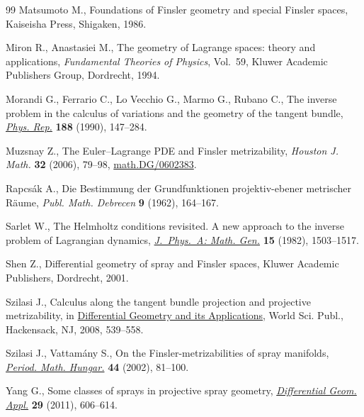 \documentclass[11pt]{article}
\numberwithin{equation}{section}
\begin{document}
\begin{thebibliography}{99}
Matsumoto M.,
Foundations of Finsler geometry and special Finsler spaces, Kaiseisha Press, Shigaken, 1986.

Miron R., Anastasiei M.,
The geometry of Lagrange spaces: theory and applications,
{\it Fundamental Theories of Physics}, Vol.~59, Kluwer Academic Publishers Group, Dordrecht, 1994.

Morandi G., Ferrario C., Lo Vecchio G., Marmo G., Rubano C.,
The inverse problem in the calculus of variations and the geometry of the tangent bundle,
\href{http://dx.doi.org/10.1016/0370-1573(90)90137-Q}{{\it Phys. Rep.}} {\bf 188} (1990), 147--284.

Muzsnay Z.,
The Euler--Lagrange PDE and Finsler metrizability,
{\it Houston J. Math.}  \textbf{32} (2006), 79--98,
\href{http://arxiv.org/abs/math.DG/0602383}{math.DG/0602383}.

Rapcs\'ak A.,
Die Bestimmung der Grundfunktionen projektiv-ebener metrischer R\"aume,
{\it Publ. Math. Debrecen} {\bf 9} (1962), 164--167.

Sarlet W.,
The Helmholtz conditions revisited. A new approach to the inverse problem of Lagrangian dynamics,
\href{http://dx.doi.org/10.1088/0305-4470/15/5/013}{{\it J.~Phys.~A: Math. Gen.}} \textbf{15} (1982), 1503--1517.

Shen Z.,
Dif\/ferential geometry of spray and Finsler spaces,
Kluwer Academic Publishers, Dordrecht, 2001.

Szilasi J.,
Calculus along the tangent bundle projection and projective metrizability,
in \href{http://dx.doi.org/10.1142/9789812790613_0045}{Dif\/ferential Geometry and its Applications},
 World Sci. Publ., Hackensack, NJ, 2008, 539--558.

Szilasi J., Vattam\'any S.,
On the Finsler-metrizabilities of spray manifolds,
\href{http://dx.doi.org/10.1023/A:1014928103275}{{\it Period. Math. Hungar.}} {\bf 44} (2002), 81--100.

Yang G.,
Some classes of sprays in projective spray geometry,
\href{http://dx.doi.org/10.1016/j.difgeo.2011.04.041}{{\it Differential Geom. Appl.}} {\bf 29} (2011), 606--614.
\end{thebibliography}
\end{document}

